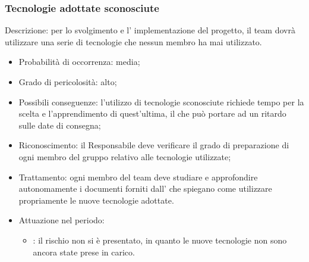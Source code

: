 \documentclass[PianoDiProgetto.tex]{subfiles}
\begin{document}
		\subsubsection{Tecnologie adottate sconosciute}
Descrizione: per lo svolgimento e l' implementazione del progetto, il team dovrà utilizzare una serie di tecnologie che nessun membro ha mai utilizzato.
	\begin{itemize}
		\item Probabilità di occorrenza: media;
		\item Grado di pericolosità: alto;
		\item Possibili conseguenze: l’utilizzo di tecnologie sconosciute richiede tempo per la scelta e l’apprendimento di quest’ultima, il che può portare ad un ritardo sulle date di consegna;
		\item Riconoscimento: il Responsabile deve verificare il grado di preparazione di ogni membro del gruppo relativo alle tecnologie utilizzate;
		\item Trattamento: ogni membro del team deve studiare e approfondire autonomamente i documenti forniti dall' \AMM{} che spiegano come utilizzare propriamente le nuove tecnologie adottate.
		\item Attuazione nel periodo: 
			\begin{itemize}
				\item \ARdoc : il rischio non si è presentato, in quanto le nuove tecnologie non sono ancora state prese in carico.
			\end{itemize}

	\end{itemize}
	
\end{document}
